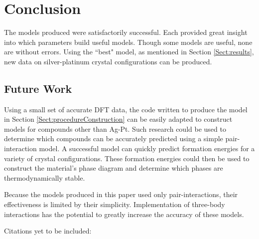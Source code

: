 \chapter{Conclusion}\label{Sect:conclusion}
\par The models produced were satisfactorily successful. Each provided great insight into which parameters build useful models. Though some models are useful, none are without errors. Using the ``best" model, as mentioned in Section \ref{Sect:results}, new data on silver-platinum crystal configurations can be produced.


\section{Future Work}\label{Sect:futureWork}
\par Using a small set of accurate DFT data, the code written to produce the model in Section \ref{Sect:procedureConstruction} can be easily adapted to construct models for compounds other than Ag-Pt. Such research could be used to determine which compounds can be accurately predicted using a simple pair-interaction model. A successful model can quickly predict formation energies for a variety of crystal configurations. These formation energies could then be used to construct the material’s phase diagram and determine which phases are thermodynamically stable.
\par Because the models produced in this paper used only pair-interactions, their effectiveness is limited by their simplicity. Implementation of three-body interactions has the potential to greatly increase the accuracy of these models.
\par Citations yet to be included: \cite{_AFLOW} \cite{Kohn1965} \cite{curt2005scienceandtech} \cite{curtarolo2003predicting} \cite{Kresse:1999wc} \cite{kresse1993abinitio} \cite{Blochl:1994dx} \cite{kresse1996efficiency} \cite{monkhorst1976special} \cite{sanchez1984generalized} \cite{laks1992efficient} \cite{lerch2009uncle} \cite{cockayne2010building} \cite{nelson2013compressive}